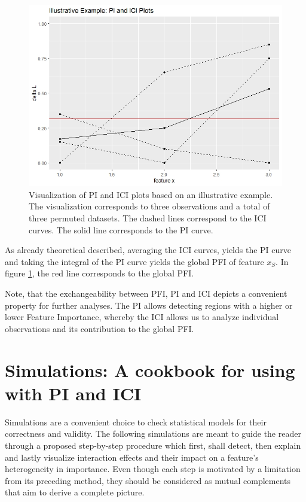 \documentclass[
]{krantz}
\begin{document}
\begin{figure}

{\centering \includegraphics[width=0.99\linewidth]{images/03-7-0} 

}

\caption{Visualization of PI and ICI plots based on an illustrative example. The visualization corresponds to three observations and a total of three permuted datasets. The dashed lines correspond to the ICI curves. The solid line corresponds to the PI curve.}\label{fig:fig0}
\end{figure}

As already theoretical described, averaging the ICI curves, yields the PI curve and taking the integral of the PI curve yields the global PFI of feature \(x_{S}\). In figure \ref{fig:fig0}, the red line corresponds to the global PFI.

Note, that the exchangeability between PFI, PI and ICI depicts a convenient property for further analyses. The PI allows detecting regions with a higher or lower Feature Importance, whereby the ICI allows us to analyze individual observations and its contribution to the global PFI.

\hypertarget{ch3}{%
\section{Simulations: A cookbook for using with PI and ICI}\label{ch3}}

Simulations are a convenient choice to check statistical models for their correctness and validity. The following simulations are meant to guide the reader through a proposed step-by-step procedure which first, shall detect, then explain and lastly visualize interaction effects and their impact on a feature's heterogeneity in importance. Even though each step is motivated by a limitation from its preceding method, they should be considered as mutual complements that aim to derive a complete picture.
\end{document}
